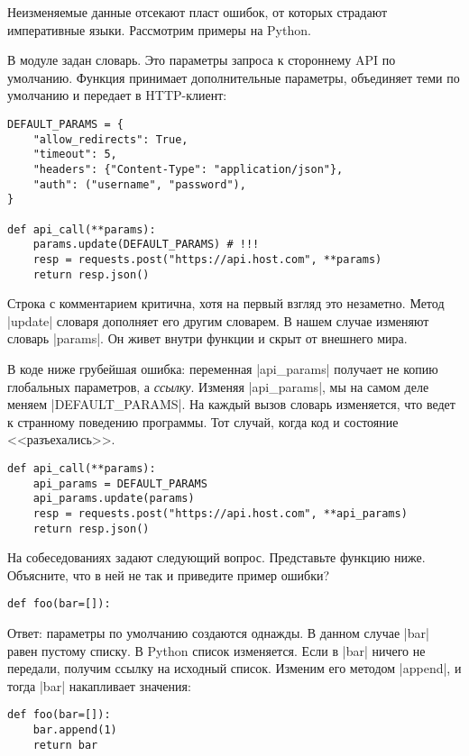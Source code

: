 Неизменяемые данные отсекают пласт ошибок, от которых страдают императивные
языки. Рассмотрим примеры на Python.

В модуле задан словарь. Это параметры запроса к стороннему API по
умолчанию. Функция принимает дополнительные параметры, объединяет теми по
умолчанию и передает в HTTP-клиент:

\begin{verbatim}
DEFAULT_PARAMS = {
    "allow_redirects": True,
    "timeout": 5,
    "headers": {"Content-Type": "application/json"},
    "auth": ("username", "password"),
}

def api_call(**params):
    params.update(DEFAULT_PARAMS) # !!!
    resp = requests.post("https://api.host.com", **params)
    return resp.json()
\end{verbatim}

Строка с комментарием критична, хотя на первый взгляд это незаметно. Метод
\spverb|update| словаря дополняет его другим словарем. В нашем случае изменяют
словарь \spverb|params|. Он живет внутри функции и скрыт от внешнего мира.

В коде ниже грубейшая ошибка: переменная \spverb|api_params| получает не копию
глобальных параметров, а \emph{ссылку}. Изменяя \spverb|api_params|, мы на самом
деле меняем \spverb|DEFAULT_PARAMS|. На каждый вызов словарь изменяется, что
ведет к странному поведению программы. Тот случай, когда код и состояние
<<разъехались>>.

\begin{verbatim}
def api_call(**params):
    api_params = DEFAULT_PARAMS
    api_params.update(params)
    resp = requests.post("https://api.host.com", **api_params)
    return resp.json()
\end{verbatim}

На собеседованиях задают следующий вопрос. Представьте функцию ниже. Объясните,
что в ней не так и приведите пример ошибки?

\begin{verbatim}
def foo(bar=[]):
\end{verbatim}

Ответ: параметры по умолчанию создаются однажды. В данном случае \spverb|bar|
равен пустому списку. В Python список изменяется. Если в \spverb|bar| ничего не
передали, получим ссылку на исходный список. Изменим его методом
\spverb|append|, и тогда \spverb|bar| накапливает значения:

\begin{verbatim}
def foo(bar=[]):
    bar.append(1)
    return bar
\end{verbatim}

